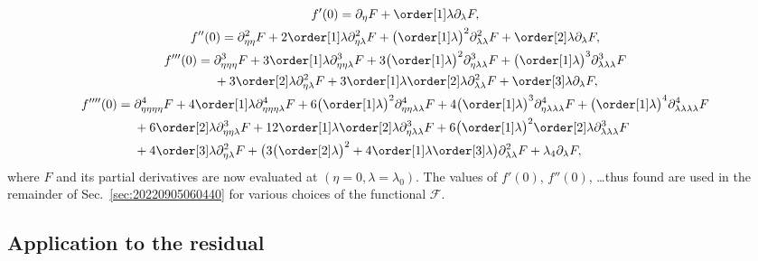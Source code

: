 \begin{gather}
  \label{eq:20220107060454}
  f'(0) = \partial_{\eta} F + \order[1]\lambda \partial_{\lambda} F,\\
  \label{eq:20220107124311}
  f''(0) = \partial_{\eta\eta}^2 F + 2 \order[1]\lambda \partial_{\eta\lambda}^2 F + \bigl( \order[1]\lambda \bigr)^2 \partial_{\lambda\lambda}^2 F + \order[2]\lambda \partial_{\lambda} F,\\
  \label{eq:20220107060500}
  \begin{aligned}[b]
    f'''(0) ={}
    & \partial_{\eta\eta\eta}^3 F + 3 \order[1]\lambda \partial_{\eta\eta\lambda}^3 F + 3 \bigl( \order[1]\lambda \bigr)^2 \partial_{\eta\lambda\lambda}^3 F + \bigl( \order[1]\lambda \bigr)^3 \partial_{\lambda\lambda\lambda}^3 F\\
    & + 3 \order[2]\lambda \partial_{\eta\lambda}^2 F + 3 \order[1]\lambda \order[2]\lambda \partial_{\lambda\lambda}^2 F + \order[3]\lambda \partial_{\lambda} F,
  \end{aligned}\\
  \label{eq:20220602185935}
  \begin{aligned}[b]
    f''''(0) ={}
    & \partial_{\eta\eta\eta\eta}^4F + 4 \order[1]\lambda \partial_{\eta\eta\eta\lambda}^4 F + 6 \bigl( \order[1]\lambda \bigr)^2 \partial_{\eta\eta\lambda\lambda}^4 F + 4 \bigl( \order[1]\lambda \bigr)^3 \partial_{\eta\lambda\lambda\lambda}^4 F + \bigl( \order[1]\lambda \bigr)^4 \partial_{\lambda\lambda\lambda\lambda}^4 F\\
    & + 6 \order[2]\lambda \partial_{\eta\eta\lambda}^3 F + 12 \order[1]\lambda \order[2]\lambda \partial_{\eta\lambda\lambda}^3 F + 6 \bigl( \order[1]\lambda \bigr)^2 \order[2]\lambda \partial_{\lambda\lambda\lambda}^3 F\\
    & + 4 \order[3]\lambda \partial_{\eta\lambda}^2 F + \bigl(3 \bigl( \order[2]\lambda \bigr)^2 + 4 \order[1]\lambda \order[3]\lambda\bigr) \partial_{\lambda\lambda}^2 F + \lambda_4 \partial_{\lambda} F,
  \end{aligned}
\end{gather}
where $F$ and its partial derivatives are now evaluated at $(\eta = 0, \lambda = \lambda_0)$. The values of $f'(0)$,
$f''(0)$, \dots thus found are used in the remainder of Sec.~\ref{sec:20220905060440} for various choices of the
functional $\mathcal F$.

\subsection{Application to the residual}
\label{sec:20211112182000}
%


